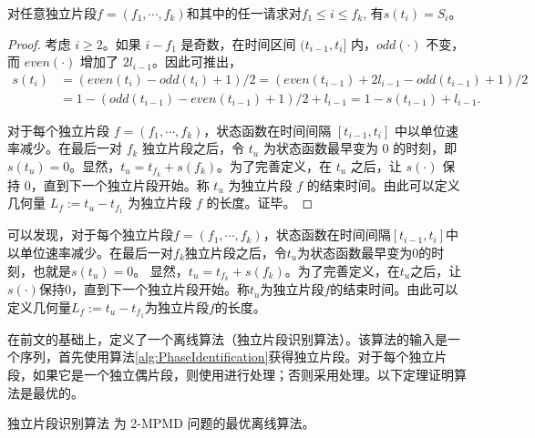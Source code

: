 \begin{lemma}\label{state-value}
对任意独立片段$f=(f_1, \cdots, f_k)$和其中的任一请求对$f_1 \leq i \leq f_k$, 有$s(t_i) = S_i$。
\end{lemma}
\begin{proof}
考虑 $i\ge 2$。如果 $i - f_1$ 是奇数，在时间区间 $(t_{i-1},t_i]$ 内，$odd(\cdot)$ 不变，而 $even(\cdot)$ 增加了 $2l_{i-1}$。因此可推出，
\begin{align*}
    s(t_i) & = (even(t_i) - odd(t_i) + 1)/2
     = (even(t_{i-1}) + 2l_{i-1} - odd(t_{i-1}) + 1)/2\\
    & = 1 - (odd(t_{i-1}) - even(t_{i-1}) + 1)/2 + l_{i-1}
     = 1 - s(t_{i-1}) + l_{i-1}.
\end{align*}

对于每个独立片段 $f =(f_1,\cdots,f_k)$，状态函数在时间间隔 $[t_{i-1},t_i]$ 中以单位速率减少。在最后一对 $f_k$ 独立片段之后，令 $t_u$ 为状态函数最早变为 $0$ 的时刻，即 $s(t_u) = 0$。显然，$t_u = t_{f_k} + s(f_k)$。为了完善定义，在 $t_u$ 之后，让 $s(\cdot)$ 保持 $0$，直到下一个独立片段开始。称 $t_u$ 为独立片段 $f$ 的结束时间。由此可以定义几何量 $L_f := t_u - t_{f_1}$ 为独立片段 $f$ 的长度。证毕。
\end{proof}

可以发现，对于每个独立片段$f =(f_1,\cdots,f_k)$，状态函数在时间间隔$[t_{i-1},t_i]$中以单位速率减少。在最后一对$f_k$独立片段之后，令$t_u$为状态函数最早变为$0$的时刻，也就是$s(t_u) = 0$。 显然，$t_u = t_{f_k} + s(f_k)$。为了完善定义，在$t_u$之后，让$s(\cdot)$保持$0$，直到下一个独立片段开始。称$t_u$为独立片段$f$的结束时间。由此可以定义几何量$L_f := t_u - t_{f_1}$为独立片段$f$的长度。

在前文的基础上，定义了一个离线算法\TOPI（独立片段识别算法）。该算法的输入是一个序列，首先使用算法\ref{alg:PhaseIdentification}获得独立片段。对于每个独立片段，如果它是一个独立偶片段，则使用\OPTE 进行处理；否则采用\OPTO 处理。以下定理证明算法\TOPI 是最优的。
\begin{theorem}
\label{thm:algorithmPI}
    独立片段识别算法 \TOPI 为 2-MPMD 问题的最优离线算法。
\end{theorem}

